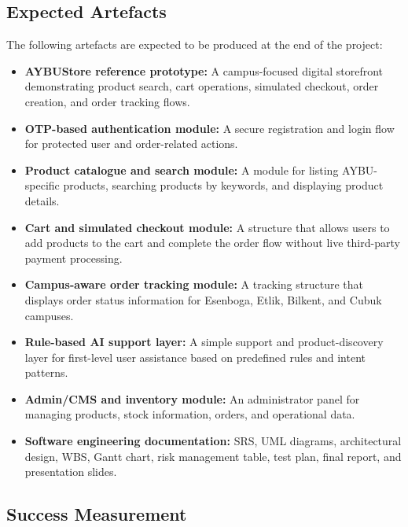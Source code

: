 \documentclass[11pt,a4paper]{article}
\begin{document}
\subsection{Expected Artefacts}

The following artefacts are expected to be produced at the end of the
project:

\begin{itemize}[leftmargin=*]
    \item \textbf{AYBUStore reference prototype:} A campus-focused
    digital storefront demonstrating product search, cart operations,
    simulated checkout, order creation, and order tracking flows.

    \item \textbf{OTP-based authentication module:} A secure
    registration and login flow for protected user and order-related
    actions.

    \item \textbf{Product catalogue and search module:} A module for
    listing AYBU-specific products, searching products by keywords, and
    displaying product details.

    \item \textbf{Cart and simulated checkout module:} A structure that
    allows users to add products to the cart and complete the order flow
    without live third-party payment processing.

    \item \textbf{Campus-aware order tracking module:} A tracking
    structure that displays order status information for Esenboga,
    Etlik, Bilkent, and Cubuk campuses.

    \item \textbf{Rule-based AI support layer:} A simple support and
    product-discovery layer for first-level user assistance based on
    predefined rules and intent patterns.

    \item \textbf{Admin/CMS and inventory module:} An administrator
    panel for managing products, stock information, orders, and
    operational data.

    \item \textbf{Software engineering documentation:} SRS, UML
    diagrams, architectural design, WBS, Gantt chart, risk management
    table, test plan, final report, and presentation slides.
\end{itemize}

\subsection{Success Measurement}
\end{document}
